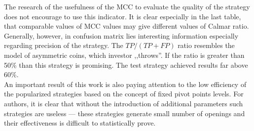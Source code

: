 \documentclass{jtacs}
\begin{document}
The research of the usefulness of the MCC to evaluate the quality of the strategy does not encourage  to use this indicator. It is clear especially in the last table, that comparable values of MCC values may give different values of Calmar ratio. Generally, however, in confusion matrix lies interesting information especially regarding precision of the strategy. The $TP /( TP + FP )$ ratio resembles the model of asymmetric coins, which  investor  ,,throws''. If the ratio is greater than 50\% than this strategy is promising. The test strategy achieved results far above 60\%. \\

An important result of this work is also paying attention to the low efficiency of the popularized strategies based on the concept of fixed pivot points levels. For authors, it is clear that without the introduction of additional parameters such strategies are useless --- these strategies generate small number of openings and their effectiveness is difficult to statistically prove.




\end{document}
